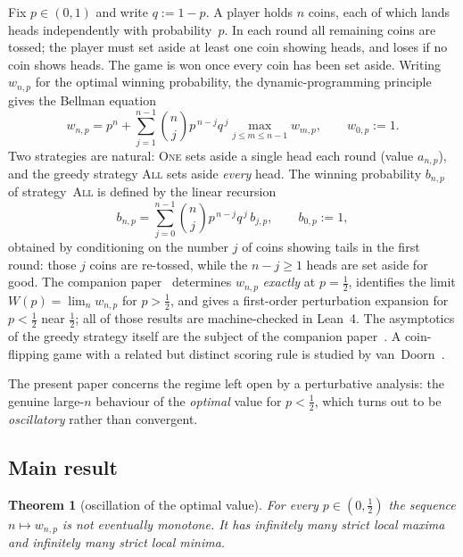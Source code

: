 \documentclass[11pt]{article}
\newtheorem{theorem}{Theorem}[section]
\theoremstyle{definition}
\newcommand{\One}{\textsc{One}}
\newcommand{\All}{\textsc{All}}
\begin{document}
Fix $p\in(0,1)$ and write $q:=1-p$. A player holds $n$ coins, each of
which lands heads independently with probability~$p$. In each round
all remaining coins are tossed; the player must set aside at least one
coin showing heads, and loses if no coin shows heads. The game is won
once every coin has been set aside. Writing $w_{n,p}$ for the optimal
winning probability, the dynamic-programming principle gives the
Bellman equation
\begin{equation}\label{eq:bellman}
  w_{n,p}=p^{n}+\sum_{j=1}^{n-1}\binom{n}{j}p^{\,n-j}q^{\,j}
          \max_{j\le m\le n-1}w_{m,p},\qquad w_{0,p}:=1 .
\end{equation}
Two strategies are natural: \One{} sets aside a single head each round
(value $a_{n,p}$), and the greedy strategy \All{} sets aside
\emph{every} head. The winning probability $b_{n,p}$ of strategy~\All{}
is defined by the linear recursion
\begin{equation}\label{eq:brec}
  b_{n,p}=\sum_{j=0}^{n-1}\binom{n}{j}p^{\,n-j}q^{\,j}\,b_{j,p},
  \qquad b_{0,p}:=1,
\end{equation}
obtained by conditioning on the number $j$ of coins showing tails in
the first round: those $j$ coins are re-tossed, while the $n-j\ge1$
heads are set aside for good. The companion paper~\cite{Paper1}
determines $w_{n,p}$ \emph{exactly} at $p=\tfrac12$, identifies the
limit $W(p)=\lim_n w_{n,p}$ for $p>\tfrac12$, and gives a first-order
perturbation expansion for $p<\tfrac12$ near $\tfrac12$; all of those
results are machine-checked in Lean~4. The asymptotics of the greedy
strategy itself are the subject of the companion paper~\cite{Paper2}.
A coin-flipping game with a related but distinct scoring rule is
studied by van~Doorn~\cite{vanDoorn}.

The present paper concerns the regime left open by a perturbative
analysis: the genuine large-$n$ behaviour of the \emph{optimal} value
for $p<\tfrac12$, which turns out to be \emph{oscillatory} rather than
convergent.

\subsection{Main result}\label{sec:main}

\begin{theorem}[oscillation of the optimal value]\label{thm:main}
  For every $p\in(0,\tfrac12)$ the sequence $n\mapsto w_{n,p}$ is not
  eventually monotone. It has infinitely many strict local maxima and
  infinitely many strict local minima.
\end{theorem}
\end{document}
